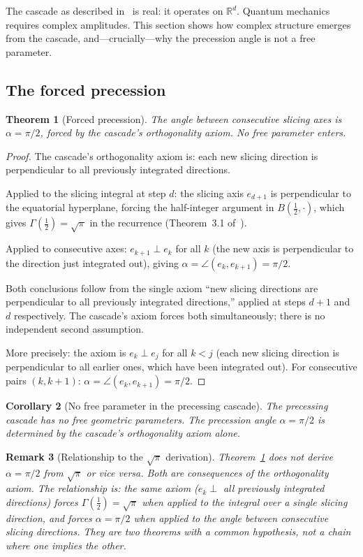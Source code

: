 \documentclass[12pt,a4paper]{article}
\newtheorem{theorem}{Theorem}[section]
\newtheorem{corollary}[theorem]{Corollary}
\newtheorem{remark}[theorem]{Remark}
\begin{document}
The cascade as described in~\cite{paperI} is real: it operates on $\mathbb{R}^d$. Quantum
mechanics requires complex amplitudes. This section shows how complex structure emerges from
the cascade, and---crucially---why the precession angle is not a free parameter.

\subsection{The forced precession}

\begin{theorem}[Forced precession]\label{thm:precession}
The angle between consecutive slicing axes is $\alpha = \pi/2$, forced by the cascade's
orthogonality axiom. No free parameter enters.
\end{theorem}
\begin{proof}
The cascade's orthogonality axiom is: each new slicing direction is perpendicular to all
previously integrated directions.

Applied to the slicing integral at step $d$: the slicing axis $e_{d+1}$ is perpendicular to
the equatorial hyperplane, forcing the half-integer argument in
$B(\frac{1}{2},\cdot)$, which gives $\Gamma(\frac{1}{2})=\sqrt{\pi}$ in the recurrence
(Theorem~3.1 of~\cite{paperI}).

Applied to consecutive axes: $e_{k+1}\perp e_k$ for all $k$ (the new axis is perpendicular
to the direction just integrated out), giving
$\alpha=\angle(e_k,e_{k+1})=\pi/2$.

Both conclusions follow from the
single axiom ``new slicing directions are perpendicular to all previously integrated
directions,'' applied at steps $d+1$ and $d$ respectively. The cascade's axiom forces both
simultaneously; there is no independent second assumption.

More precisely: the axiom is $e_k\perp e_j$ for all $k<j$ (each new slicing direction is
perpendicular to all earlier ones, which have been integrated out). For consecutive pairs
$(k,k+1)$: $\alpha=\angle(e_k,e_{k+1})=\pi/2$.
\end{proof}

\begin{corollary}[No free parameter in the precessing cascade]\label{cor:nofree}
The precessing cascade has no free geometric parameters. The precession angle $\alpha=\pi/2$
is determined by the cascade's orthogonality axiom alone.
\end{corollary}

\begin{remark}[Relationship to the $\sqrt{\pi}$ derivation]
Theorem~\ref{thm:precession} does not derive $\alpha=\pi/2$ from $\sqrt{\pi}$ or vice
versa. Both are consequences of the orthogonality axiom. The relationship is: the same
axiom ($e_k\perp$ all previously integrated directions) forces $\Gamma(\tfrac{1}{2})
=\sqrt{\pi}$ when applied to the integral over a single slicing direction, and forces
$\alpha=\pi/2$ when applied to the angle between consecutive slicing directions. They are
two theorems with a common hypothesis, not a chain where one implies the other.
\end{remark}
\end{document}
